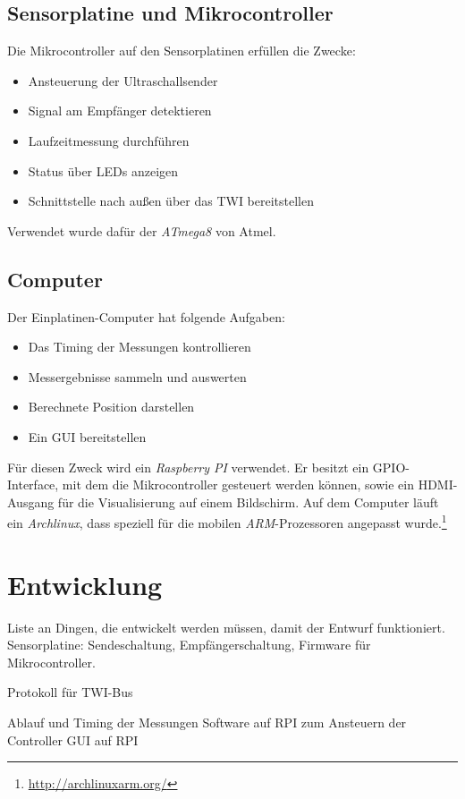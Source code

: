 \subsection{Sensorplatine und Mikrocontroller}
Die Mikrocontroller auf den Sensorplatinen erfüllen die Zwecke:
\begin{itemize}
	\item Ansteuerung der Ultraschallsender
	\item Signal am Empfänger detektieren
	\item Laufzeitmessung durchführen
	\item Status über \ac{LED}s anzeigen
	\item Schnittstelle nach außen über das \ac{TWI} bereitstellen
\end{itemize}
Verwendet wurde dafür der \textit{ATmega8} von Atmel.  %


\subsection{Computer}
Der Einplatinen-Computer hat folgende Aufgaben:
\begin{itemize}
	\item Das Timing der Messungen kontrollieren
	\item Messergebnisse sammeln und auswerten
	\item Berechnete Position darstellen
	\item Ein \ac{GUI} bereitstellen
\end{itemize}
Für diesen Zweck wird ein \textit{Raspberry PI} verwendet. Er besitzt ein \ac{GPIO}-Interface, mit dem die Mikrocontroller gesteuert werden können, sowie ein \ac{HDMI}-Ausgang für die Visualisierung auf einem Bildschirm. Auf dem Computer läuft ein \textit{Archlinux}, dass speziell für die mobilen \textit{ARM}-Prozessoren angepasst wurde.\footnote{\url{http://archlinuxarm.org/}}



\section{Entwicklung} %
Liste an Dingen, die entwickelt werden müssen, damit der Entwurf funktioniert.
Sensorplatine:
Sendeschaltung,
Empfängerschaltung,
Firmware für Mikrocontroller.

Protokoll für TWI-Bus

Ablauf und Timing der Messungen
Software auf RPI zum Ansteuern der Controller
GUI auf RPI



